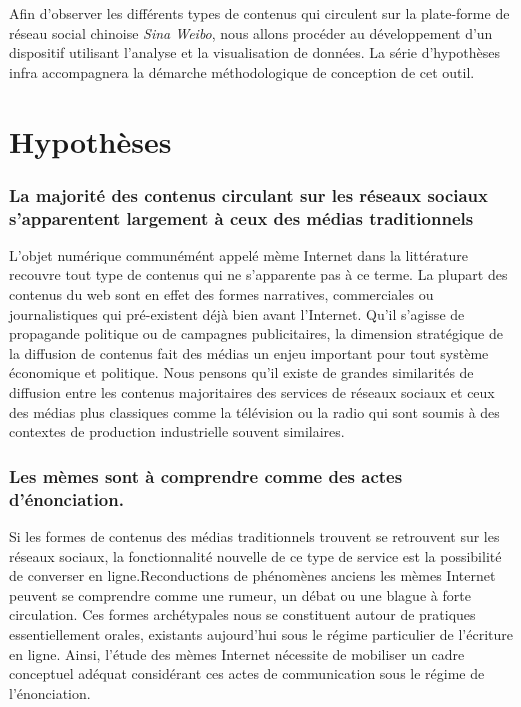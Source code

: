 Afin d'observer les différents types de contenus qui circulent sur la plate-forme de réseau social chinoise \textit{Sina Weibo}, nous allons procéder au développement d'un dispositif utilisant l'analyse et la visualisation de données. La série d'hypothèses infra accompagnera la démarche méthodologique de conception de cet outil.

\section*{Hypothèses}
\label{sec:hypotheses}

\subsubsection{La majorité des contenus circulant sur les réseaux sociaux s'apparentent largement à ceux des médias traditionnels} 

L'objet numérique communémént appelé mème Internet dans la littérature recouvre tout type de contenus qui ne s'apparente pas à ce terme. La plupart des contenus du web sont en effet des formes narratives, commerciales ou journalistiques qui pré-existent déjà bien avant l'Internet. Qu{\textquoteright}il s{\textquoteright}agisse de propagande politique ou de campagnes publicitaires, la dimension stratégique de la diffusion de contenus fait des médias un enjeu important pour tout système économique et politique. Nous pensons qu{\textquoteright}il existe de grandes similarités de diffusion entre les contenus majoritaires des services de réseaux sociaux et ceux des médias plus classiques comme la télévision ou la radio qui sont soumis à des contextes de production industrielle souvent similaires.

\subsubsection{Les mèmes sont à comprendre comme des actes d'énonciation.}

Si les formes de contenus des médias traditionnels trouvent se retrouvent sur les réseaux sociaux, la fonctionnalité nouvelle de ce type de service est la possibilité de converser en ligne.Reconductions de phénomènes anciens les mèmes Internet peuvent se comprendre comme une rumeur, un débat ou une blague à forte circulation. Ces formes archétypales nous se constituent autour de pratiques essentiellement orales, existants aujourd'hui sous le régime particulier de l'écriture en ligne. Ainsi, l'étude des  mèmes Internet nécessite de mobiliser un cadre conceptuel adéquat considérant ces actes de communication sous le régime de l'énonciation.


